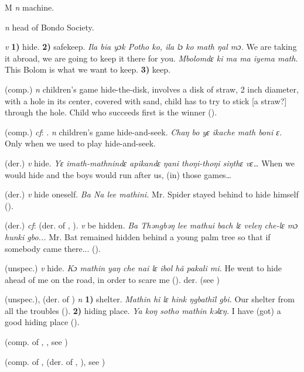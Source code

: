 \begin{letter}{M}
 \textit{n} machine.

 \textit{n} head of Bondo Society.

 \textit{v} \textbf{1)} hide. \textbf{2)} safekeep. \textit{Ila bia yɔk Potho ko, ila lɔ ko math ŋal mɔ.} We are taking it abroad, we are going to keep it there for you. \textit{Mbolomdɛ ki ma ma iyema math.} This Bolom is what we want to keep. \textbf{3)} keep.

 (comp.) \textit{n} children's game hide-the-disk, involves a disk of straw, 2 inch diameter, with a hole in its center, covered with sand, child has to try to stick [a straw?] through the hole. Child who succeeds first is the winner (\citealt{Pichl1967}). 

 (comp.) \textit{cf}: . \textit{n} children's game hide-and-seek. \textit{Chaŋ bo yɛ ikache math boni ɛ.} Only when we used to play hide-and-seek.

 (der.) \textit{v} hide. \textit{Yɛ imath-mathnindɛ apikandɛ ŋani thoŋi-thoŋi siŋthɛ vɛ…} When we would hide and the boys would run after us, (in) those games…

 (der.) \textit{v} hide oneself. \textit{Ba Na lee mathini.} Mr. Spider stayed behind to hide himself (\citealt{Pichl1967}).

 (der.) \textit{cf}:  (der. of , ). \textit{v} be hidden. \textit{Ba Thəngbəŋ lee mathui bach lɛ veleŋ che-lɛ mɔ hunki gbo...} Mr. Bat remained hidden behind a young palm tree so that if somebody came there... (\citealt{Pichl1967}). 

 (unspec.) \textit{v} hide. \textit{Kɔ mathin yaŋ che nai lɛ ibol hã pakali mi.} He went to hide ahead of me on the road, in order to scare me (\citealt{Pichl1967}). der.  (see )

 (unspec.), (der. of ) \textit{n} \textbf{1)} shelter. \textit{Mathin hĩ lɛ hink ŋgbathïl gbi.} Our shelter from all the troubles (\citealt{Pichl1967}). \textbf{2)} hiding place. \textit{Ya koŋ sotho mathin kəlɛŋ.} I have (got) a good hiding place (\citealt{Pichl1967}). 

 (comp. of , , see ) 

 (comp. of ,  (der. of , ), see ) 


\end{letter}
